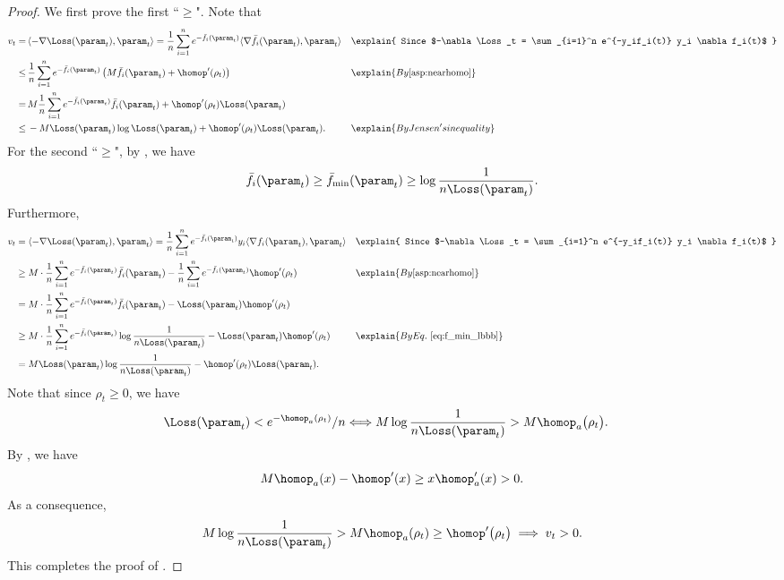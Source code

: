 \begin{proof}
We first prove the first ``$\ge$". Note that
\begin{align*}
    v_t = \, & \langle -\nabla \Loss (\param_t),\param_t \rangle = \frac{1}{n}\sum_{i=1}^n e^{-\bar f_i(\param_t)} \langle \nabla \bar f_i(\param_t), \param_t \rangle &&\explain{ Since $-\nabla \Loss_t = \sum_{i=1}^n e^{-y_if_i(t)} y_i \nabla f_i(t)$ } \\
    \le \, & \frac{1}{n}\sum_{i=1}^n e^{-\bar f_i(\param_t)} \left( M \bar f_i(\param_t) + \homop'(\rho_t) \right) && \explain{By \Cref{asp:nearhomo} } \\
    = \, & M \frac{1}{n} \sum_{i=1}^{n} e^{-\bar f_i(\param_t)} \bar f_i(\param_t) + \homop'(\rho_t) \Loss (\param_t) \\
    \le \, & - M \Loss (\param_t) \log \Loss (\param_t) + \homop' (\rho_t) \Loss (\param_t). && \explain{By Jensen's inequality}
\end{align*}
For the second ``$\ge$", by , we have 
\begin{equation}
\label{eq:f_min_lbbb}
        \bar f_i(\param_t) \ge \bar f_{\min}(\param_t) \ge \log \frac{1}{n\Loss (\param_t)}. 
\end{equation}
Furthermore, 
\begin{align*}
    v_t
    & = \langle -\nabla \Loss (\param_t),\param_t \rangle = \frac{1}{n}\sum_{i=1}^n e^{-\bar f_i(\param_t)} y_i  \langle \nabla f_i(\param_t), \param_t \rangle &&\explain{ Since $-\nabla \Loss_t = \sum_{i=1}^n e^{-y_if_i(t)} y_i \nabla f_i(t)$ } \\
    & \ge M \cdot \frac{1}{n}\sum_{i=1}^n e^{-\bar f_i(\param_t)} \bar f_i(\param_t) - \frac{1}{n}\sum_{i=1}^n e^{-\bar f_i(\param_t)}\homop^{\prime}(\rho_t) &&\explain{ By \Cref{asp:nearhomo} } \\
    & = M \cdot\frac{1}{n}\sum_{i=1}^n e^{-\bar f_i(\param_t)} \bar f_i(\param_t) - \Loss (\param_t) \homop^{\prime}(\rho_t) \\ 
    & \ge M \cdot\frac{1}{n}\sum_{i=1}^n e^{-\bar f_i(\param_t)} \log \frac{1}{n \Loss (\param_t)}- \Loss (\param_t) \homop^{\prime}(\rho_t) &&\explain{ By Eq.~\Cref{eq:f_min_lbbb}} \\ 
    & =   M \Loss (\param_t) \log \frac{1}{n\Loss (\param_t)} - \homop^{\prime}(\rho_t)\Loss (\param_t). 
\end{align*}
Note that since $\rho_t \ge 0$, we have 
\begin{align*}
    \Loss (\param_t) < e^{-\homop_a(\rho_t)}/n \Longleftrightarrow M\log \frac{1}{n \Loss (\param_t)} & >   M \homop_a \big(\rho_t \big).
\end{align*}
By , we have 
\[
    M \homop_a(x) - \homop' (x) \ge x \homop_a^\prime(x) > 0. 
\]
As a consequence, 
\[
     M\log \frac{1}{n \Loss (\param_t)}  >  M \homop_a (\rho_t) \ge \homop^\prime\big(\rho_t \big) \implies v_t >0. 
\]
This completes the proof of . 
\end{proof}


